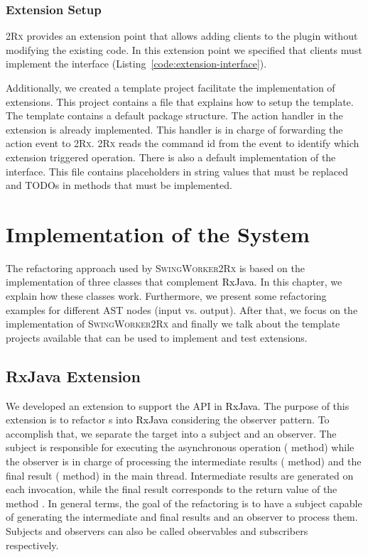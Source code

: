 \documentclass[type=bsc,accentcolor=tud9c]{tudthesis}
\newcommand{\framework}[1]{\textcolor{black}{#1}}
\newcommand{\toolcore}{\textsc{2Rx}}
\newcommand{\toolextension}{\textsc{SwingWorker2Rx}}
\begin{document}
\subsection{Extension Setup}
\toolcore{} provides an extension point that allows adding clients to the plugin without modifying the existing code. In this extension point we specified that clients must implement the interface  (Listing~\ref{code:extension-interface}).



Additionally, we created a template project facilitate the implementation of extensions. This project contains a  file that explains how to setup the template. The template contains a default package structure. The action handler in the extension is already implemented. This handler is in charge of forwarding the action event to \toolcore{}. \toolcore{} reads the command id from the event to identify which extension triggered operation. There is also a default implementation of the  interface. This file contains placeholders in string values that must be replaced and TODOs in methods that must be implemented.

\chapter{Implementation of the System}
\label{chapter:implementation}
The refactoring approach used by \toolextension{} is based on the implementation of three classes that complement \framework{RxJava}. In this chapter, we explain how these classes work. Furthermore, we present some refactoring examples for different AST nodes (input vs. output). After that, we focus on the implementation of \toolextension{} and finally we talk about the template projects available that can be used to implement and test extensions.

\section{RxJava Extension}
\label{sec:rxjava-extension}
We developed an extension to support the  API in \framework{RxJava}. The purpose of this extension is to refactor s into \framework{RxJava} considering the observer pattern. To accomplish that, we separate the target  into a subject and an observer. The subject is responsible for executing the asynchronous operation ( method) while the observer is in charge of processing the intermediate results ( method) and the final result ( method) in the main thread. Intermediate results are generated on each  invocation, while the final result corresponds to the return value of the method . In general terms, the goal of the refactoring is to have a subject capable of generating the intermediate and final results and an observer to process them. Subjects and observers can also be called observables and subscribers respectively.
\end{document}
